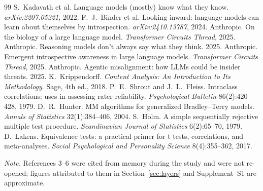 \begin{thebibliography}{99}
 S.~Kadavath et al. Language models (mostly) know what they know. \emph{arXiv:2207.05221}, 2022.
 F.~J.~Binder et al. Looking inward: language models can learn about themselves by introspection. \emph{arXiv:2410.13787}, 2024.
 Anthropic. On the biology of a large language model. \emph{Transformer Circuits Thread}, 2025.
 Anthropic. Reasoning models don't always say what they think. 2025.
 Anthropic. Emergent introspective awareness in large language models. \emph{Transformer Circuits Thread}, 2025.
 Anthropic. Agentic misalignment: how LLMs could be insider threats. 2025.
 K.~Krippendorff. \emph{Content Analysis: An Introduction to Its Methodology}. Sage, 4th ed., 2018.
 P.~E.~Shrout and J.~L.~Fleiss. Intraclass correlations: uses in assessing rater reliability. \emph{Psychological Bulletin} 86(2):420--428, 1979.
 D.~R.~Hunter. MM algorithms for generalized Bradley--Terry models. \emph{Annals of Statistics} 32(1):384--406, 2004.
 S.~Holm. A simple sequentially rejective multiple test procedure. \emph{Scandinavian Journal of Statistics} 6(2):65--70, 1979.
 D.~Lakens. Equivalence tests: a practical primer for t tests, correlations, and meta-analyses. \emph{Social Psychological and Personality Science} 8(4):355--362, 2017.
\end{thebibliography}
\noindent\textit{Note.} References 3--6 were cited from memory during the study and were not re-opened; figures
attributed to them in Section~\ref{sec:layers} and Supplement~S1 are approximate.

